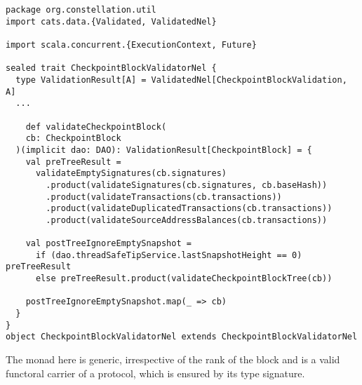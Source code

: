 \documentclass{article}
\begin{document}
\begin{lstlisting}[style=myScalastyle]
package org.constellation.util
import cats.data.{Validated, ValidatedNel}

import scala.concurrent.{ExecutionContext, Future}

sealed trait CheckpointBlockValidatorNel {
  type ValidationResult[A] = ValidatedNel[CheckpointBlockValidation, A]
  ...
  
    def validateCheckpointBlock(
    cb: CheckpointBlock
  )(implicit dao: DAO): ValidationResult[CheckpointBlock] = {
    val preTreeResult =
      validateEmptySignatures(cb.signatures)
        .product(validateSignatures(cb.signatures, cb.baseHash))
        .product(validateTransactions(cb.transactions))
        .product(validateDuplicatedTransactions(cb.transactions))
        .product(validateSourceAddressBalances(cb.transactions))

    val postTreeIgnoreEmptySnapshot =
      if (dao.threadSafeTipService.lastSnapshotHeight == 0) preTreeResult
      else preTreeResult.product(validateCheckpointBlockTree(cb))

    postTreeIgnoreEmptySnapshot.map(_ => cb)
  }
}
object CheckpointBlockValidatorNel extends CheckpointBlockValidatorNel
\end{lstlisting}
The monad here is generic, irrespective of the rank of the block and is a valid functoral carrier of a protocol, which is ensured by its type signature.
\end{document}
